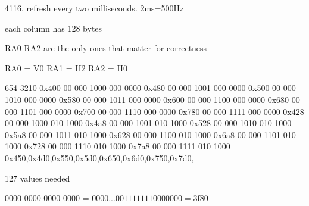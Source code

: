 \documentclass{article}
\begin{document}
4116, refresh every two milliseconds. 2ms=500Hz

each column has 128 bytes

RA0-RA2 are the only ones that matter for correctness

RA0 = V0
RA1 = H2
RA2 = H0

           654 3210
0x400	00 000 1000 000 0000
0x480	00 000 1001 000 0000
0x500	00 000 1010 000 0000
0x580	00 000 1011 000 0000
0x600	00 000 1100 000 0000
0x680	00 000 1101 000 0000
0x700	00 000 1110 000 0000
0x780	00 000 1111 000 0000
0x428	00 000 1000 010 1000
0x4a8	00 000 1001 010 1000
0x528	00 000 1010 010 1000
0x5a8	00 000 1011 010 1000
0x628	00 000 1100 010 1000
0x6a8	00 000 1101 010 1000
0x728	00 000 1110 010 1000
0x7a8	00 000 1111 010 1000
0x450,0x4d0,0x550,0x5d0,0x650,0x6d0,0x750,0x7d0,

127 values needed

0000 0000 0000 0000 = $0000	
...
0011 1111 1000 0000 = $3f80














\end{document}
